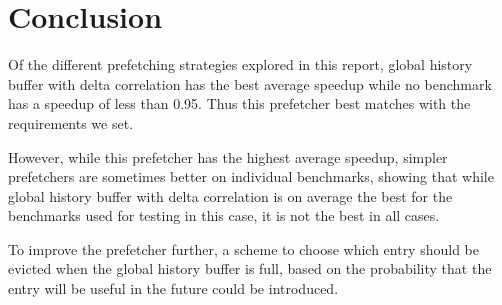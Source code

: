 \section{Conclusion}
\label{sec:conclusion}

Of the different prefetching strategies explored in this report,
global history buffer with delta correlation has the best average
speedup while no benchmark has a speedup of less than 0.95. Thus
this prefetcher best matches with the requirements we set.

However, while this prefetcher has the highest average
speedup, simpler prefetchers are sometimes better on
individual benchmarks, showing that while global history buffer
with delta correlation is on average the best for the benchmarks
used for testing in this case, it is not the best in all cases.

To improve the prefetcher further, a scheme to choose which
entry should be evicted when the global history buffer is full,
based on the probability that the entry will be useful in the
future could be introduced.

